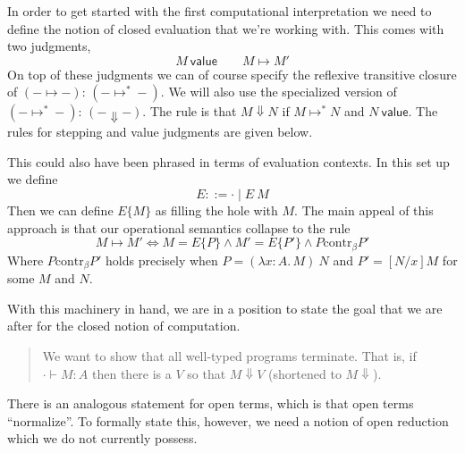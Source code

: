 \documentclass{article}
\newcommand{\hasEF}[3]{\ensuremath{#1 \vdash #2 : #3}}
\newcommand{\AND}{\mathrel{\wedge}}
\newcommand{\step}[2]{\ensuremath{#1 \mapsto #2}}
\newcommand{\steps}[2]{\ensuremath{#1 \mapsto^* #2}}
\newcommand{\eval}[2]{\ensuremath{#1 \mathrel{\Downarrow} #2}}
\newcommand{\valueJ}[1]{\ensuremath{#1\ \mathsf{value}}}
\newcommand{\fillin}[2]{\ensuremath{#1\{#2\}}}
\newcommand{\ap}[2]{\ensuremath{#1\ #2}}
\newcommand{\lam}[3]{\ensuremath{\lambda #1 {:} #2.\, #3}}
\begin{document}
In order to get started with the first computational interpretation we
need to define the notion of closed evaluation that we're working
with. This comes with two judgments,
\[
  \valueJ{M} \qquad
  \step{M}{M'}
\]
On top of these judgments we can of course specify the reflexive
transitive closure of $(\step{-}{-})$: $(\steps{-}{-})$. We will also
use the specialized version of $(\steps{-}{-})$: $(\eval{-}{-})$. The
rule is that $\eval{M}{N}$ if $\steps{M}{N}$ and $\valueJ{N}$. The
rules for stepping and value judgments are given below.
This could also have been phrased in terms of evaluation contexts. In
this set up we define
\[
  E ::= \cdot \mid \ap{E}{M}
\]
Then we can define $\fillin{E}{M}$ as filling the hole with $M$. The
main appeal of this approach is that our operational semantics
collapse to the rule
\[
  \step{M}{M'} \iff M = \fillin{E}{P} \AND M' = \fillin{E}{P'} \AND P \mathrel{\text{contr}_\beta} P'
\]
Where $P \mathrel{\text{contr}_\beta} P'$ holds precisely when
$P = \ap{(\lam{x}{A}{M})}{N}$ and $P' = [N/x]M$ for some $M$ and $N$.

With this machinery in hand, we are in a position to state the goal
that we are after for the closed notion of computation.
\begin{quote}
  We want to show that all well-typed programs terminate. That is, if
  $\hasEF{\cdot}{M}{A}$ then there is a $V$ so that $\eval{M}{V}$
  (shortened to $M \Downarrow$).
\end{quote}
There is an analogous statement for open terms, which is that open
terms ``normalize''. To formally state this, however, we need a notion
of open reduction which we do not currently possess.
\end{document}
